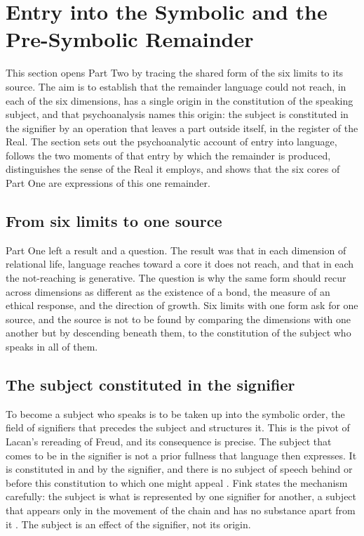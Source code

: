 \section{Entry into the Symbolic and the Pre-Symbolic Remainder}
\label{p26:sec:entry}

\noindent
This section opens Part Two by tracing the shared form of the six limits to its source. The aim is to establish that the remainder language could not reach, in each of the six dimensions, has a single origin in the constitution of the speaking subject, and that psychoanalysis names this origin: the subject is constituted in the signifier by an operation that leaves a part outside itself, in the register of the Real. The section sets out the psychoanalytic account of entry into language, follows the two moments of that entry by which the remainder is produced, distinguishes the sense of the Real it employs, and shows that the six cores of Part One are expressions of this one remainder.

\subsection*{From six limits to one source}

Part One left a result and a question. The result was that in each dimension of relational life, language reaches toward a core it does not reach, and that in each the not-reaching is generative. The question is why the same form should recur across dimensions as different as the existence of a bond, the measure of an ethical response, and the direction of growth. Six limits with one form ask for one source, and the source is not to be found by comparing the dimensions with one another but by descending beneath them, to the constitution of the subject who speaks in all of them.

\subsection*{The subject constituted in the signifier}

To become a subject who speaks is to be taken up into the symbolic order, the field of signifiers that precedes the subject and structures it. This is the pivot of Lacan's rereading of Freud, and its consequence is precise. The subject that comes to be in the signifier is not a prior fullness that language then expresses. It is constituted in and by the signifier, and there is no subject of speech behind or before this constitution to which one might appeal \parencite{lacan2006ecrits}. Fink states the mechanism carefully: the subject is what is represented by one signifier for another, a subject that appears only in the movement of the chain and has no substance apart from it \parencite{fink1995subject}. The subject is an effect of the signifier, not its origin.


